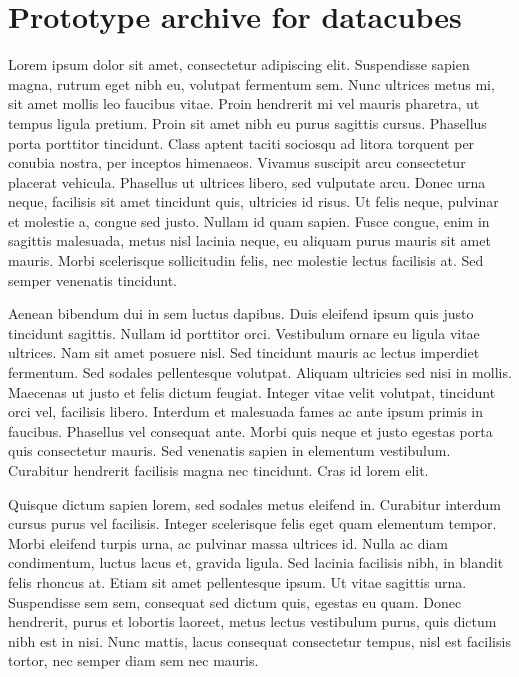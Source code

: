 \chapter{Prototype archive for datacubes}\label{ch:archive}

Lorem ipsum dolor sit amet, consectetur adipiscing elit. Suspendisse sapien magna, rutrum eget nibh eu, volutpat fermentum sem. Nunc ultrices metus mi, sit amet mollis leo faucibus vitae. Proin hendrerit mi vel mauris pharetra, ut tempus ligula pretium. Proin sit amet nibh eu purus sagittis cursus. Phasellus porta porttitor tincidunt. Class aptent taciti sociosqu ad litora torquent per conubia nostra, per inceptos himenaeos. Vivamus suscipit arcu consectetur placerat vehicula. Phasellus ut ultrices libero, sed vulputate arcu. Donec urna neque, facilisis sit amet tincidunt quis, ultricies id risus. Ut felis neque, pulvinar et molestie a, congue sed justo. Nullam id quam sapien. Fusce congue, enim in sagittis malesuada, metus nisl lacinia neque, eu aliquam purus mauris sit amet mauris. Morbi scelerisque sollicitudin felis, nec molestie lectus facilisis at. Sed semper venenatis tincidunt.


Aenean bibendum dui in sem luctus dapibus. Duis eleifend ipsum quis justo tincidunt sagittis. Nullam id porttitor orci. Vestibulum ornare eu ligula vitae ultrices. Nam sit amet posuere nisl. Sed tincidunt mauris ac lectus imperdiet fermentum. Sed sodales pellentesque volutpat. Aliquam ultricies sed nisi in mollis. Maecenas ut justo et felis dictum feugiat. Integer vitae velit volutpat, tincidunt orci vel, facilisis libero. Interdum et malesuada fames ac ante ipsum primis in faucibus. Phasellus vel consequat ante. Morbi quis neque et justo egestas porta quis consectetur mauris. Sed venenatis sapien in elementum vestibulum. Curabitur hendrerit facilisis magna nec tincidunt. Cras id lorem elit.


Quisque dictum sapien lorem, sed sodales metus eleifend in. Curabitur interdum cursus purus vel facilisis. Integer scelerisque felis eget quam elementum tempor. Morbi eleifend turpis urna, ac pulvinar massa ultrices id. Nulla ac diam condimentum, luctus lacus et, gravida ligula. Sed lacinia facilisis nibh, in blandit felis rhoncus at. Etiam sit amet pellentesque ipsum. Ut vitae sagittis urna. Suspendisse sem sem, consequat sed dictum quis, egestas eu quam. Donec hendrerit, purus et lobortis laoreet, metus lectus vestibulum purus, quis dictum nibh est in nisi. Nunc mattis, lacus consequat consectetur tempus, nisl est facilisis tortor, nec semper diam sem nec mauris.


